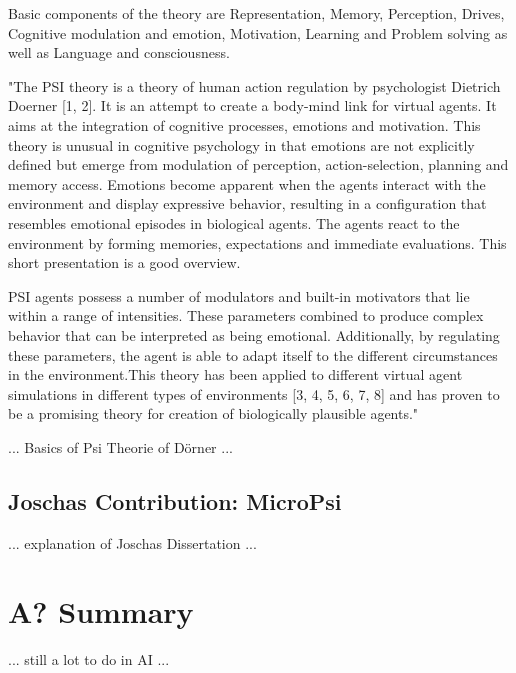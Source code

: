 Basic components of the theory are Representation, Memory, Perception, Drives, Cognitive modulation and emotion, Motivation, Learning and Problem solving as well as Language and consciousness.

"The PSI theory is a theory of human action regulation by psychologist Dietrich Doerner [1, 2]. It is an attempt to create a body-mind link for virtual agents. It aims at the integration of cognitive processes, emotions and motivation. This theory is unusual in cognitive psychology in that emotions are not explicitly defined but emerge from modulation of perception, action-selection, planning and memory access. Emotions become apparent when the agents interact with the environment and display expressive behavior, resulting in a configuration that resembles emotional episodes in biological agents. The agents react to the environment by forming memories, expectations and immediate evaluations. This short presentation is a good overview.

PSI agents possess a number of modulators and built-in motivators that lie within a range of intensities. These parameters combined to produce complex behavior that can be interpreted as being emotional. Additionally, by regulating these parameters, the agent is able to adapt itself to the different circumstances in the environment.This theory has been applied to different virtual agent simulations in different types of environments [3, 4, 5, 6, 7, 8] and has proven to be a promising theory for creation of biologically plausible agents."


... Basics of Psi Theorie of Dörner ...

\subsection{Joschas Contribution: MicroPsi}
... explanation of Joschas Dissertation ...

\section{A? Summary}
... still a lot to do in AI ...